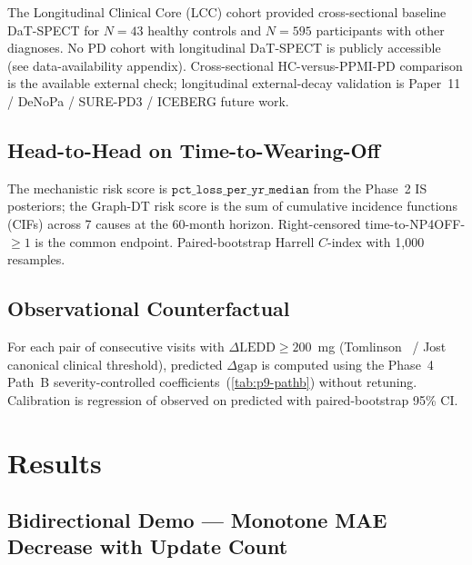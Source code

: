The Longitudinal Clinical Core (LCC) cohort provided cross-sectional baseline DaT-SPECT for $N = 43$ healthy controls and $N = 595$ participants with other diagnoses. No PD cohort with longitudinal DaT-SPECT is publicly accessible (see data-availability appendix). Cross-sectional HC-versus-PPMI-PD comparison is the available external check; longitudinal external-decay validation is Paper~11 / DeNoPa / SURE-PD3 / ICEBERG future work.

\subsection{Head-to-Head on Time-to-Wearing-Off}

The mechanistic risk score is $\texttt{pct\_loss\_per\_yr\_median}$ from the Phase~2 IS posteriors; the Graph-DT risk score is the sum of cumulative incidence functions (CIFs) across 7 causes at the 60-month horizon. Right-censored time-to-NP4OFF-$\geq 1$ is the common endpoint. Paired-bootstrap Harrell $C$-index with 1{,}000 resamples.

\subsection{Observational Counterfactual}

For each pair of consecutive visits with $\Delta\mathrm{LEDD} \geq 200$~mg (Tomlinson~\cite{tomlinson2010ledd} / Jost~\cite{jost2023ledd} canonical clinical threshold), predicted $\Delta\text{gap}$ is computed using the Phase~4 Path~B severity-controlled coefficients~(\ref{tab:p9-pathb}) without retuning. Calibration is regression of observed on predicted with paired-bootstrap 95\% CI.

\section{Results}
\label{sec:p10-results}

\subsection{Bidirectional Demo --- Monotone MAE Decrease with Update Count}

